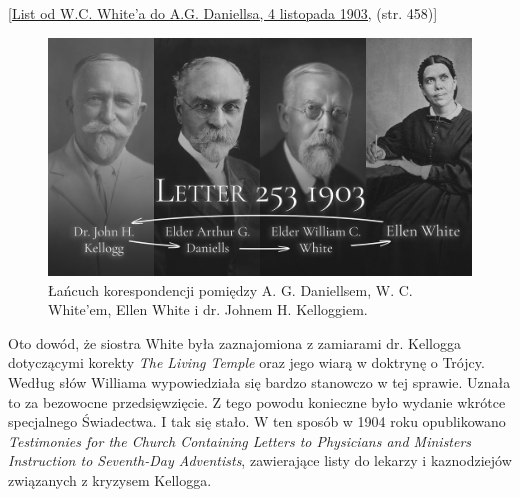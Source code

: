 

[\href{https://ellenwhite.org/letterbooks/555}{List od W.C. White'a do A.G. Daniellsa, 4 listopada 1903,} (str. 458)]

\begin{figure}[h]
    \centering
    \includegraphics[width=1\linewidth]{images/correspondance.jpg}
    \caption*{Łańcuch korespondencji pomiędzy A. G. Daniellsem, W. C. White'em, Ellen White i dr. Johnem H. Kelloggiem.}
    \label{fig:corespondance}
\end{figure}

Oto dowód, że siostra White była zaznajomiona z zamiarami dr. Kellogga dotyczącymi korekty \textit{The Living Temple} oraz jego wiarą w doktrynę o Trójcy. Według słów Williama wypowiedziała się bardzo stanowczo w tej sprawie. Uznała to za bezowocne przedsięwzięcie. Z tego powodu konieczne było wydanie wkrótce specjalnego Świadectwa. I tak się stało. W ten sposób w 1904 roku opublikowano \textit{Testimonies for the Church Containing Letters to Physicians and Ministers Instruction to Seventh-Day Adventists}, zawierające listy do lekarzy i kaznodziejów związanych z kryzysem Kellogga.

